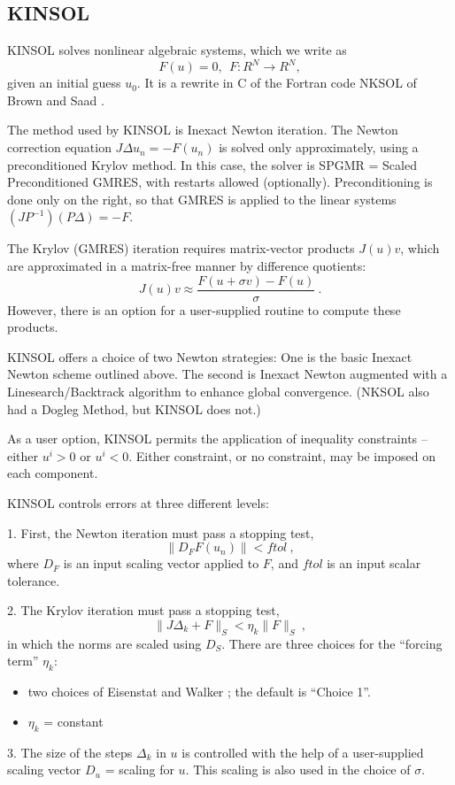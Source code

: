 \subsection{KINSOL}

KINSOL solves nonlinear algebraic systems, which we write as
\[ F(u) = 0,~~ F:R^N \rightarrow R^N, \]
given an initial guess $u_0$.  It is a rewrite in C of the Fortran
code NKSOL of Brown and Saad \cite{BrSa:90}.

The method used by KINSOL is Inexact Newton iteration.  The Newton
correction equation $J \Delta u_n = -F(u_n)$ is solved only
approximately, using a preconditioned Krylov method.  In this case,
the solver is SPGMR = Scaled Preconditioned GMRES, with restarts
allowed (optionally).  Preconditioning is done only on the right, so
that GMRES is applied to the linear systems $(JP^{-1})(P\Delta) = -F$.

The Krylov (GMRES) iteration requires matrix-vector products $J(u)v$,
which are approximated in a matrix-free manner by difference quotients:
\[ J(u)v \approx \frac{F(u+\sigma v) - F(u)}{\sigma} ~. \]
However, there is an option for a user-supplied routine to compute
these products.

KINSOL offers a choice of two Newton strategies: One is the basic
Inexact Newton scheme outlined above.  The second is Inexact Newton
augmented with a Linesearch/Backtrack algorithm to enhance global
convergence.  (NKSOL also had a Dogleg Method, but KINSOL does not.)

As a user option, KINSOL permits the application of inequality
constraints -- either $u^i > 0$ or $u^i < 0$.  Either constraint, or
no constraint, may be imposed on each component.

KINSOL controls errors at three different levels:

1. First, the Newton iteration must pass a stopping test,
\[ \|D_F F(u_n)\| < ftol ~, \]
where $D_F$ is an input scaling vector applied to $F$, and $ftol$ is
an input scalar tolerance.

2. The Krylov iteration must pass a stopping test,
\[ \|J \Delta_k + F\|_S < \eta_k \|F\|_S ~, \]
in which the norms are scaled using $D_S$.  There are three choices
for the ``forcing term'' $\eta_k$:
\vspace*{-.19in}
\begin{itemize}
\item two choices of Eisenstat and Walker \cite{EiWa:96}; the default
is ``Choice 1''.
\item  $\eta_k$ = constant
\end{itemize}

3. The size of the steps $\Delta_k$ in $u$ is controlled with the help
of a user-supplied scaling vector $D_u$ = scaling for $u$.  This
scaling is also used in the choice of $\sigma$.



